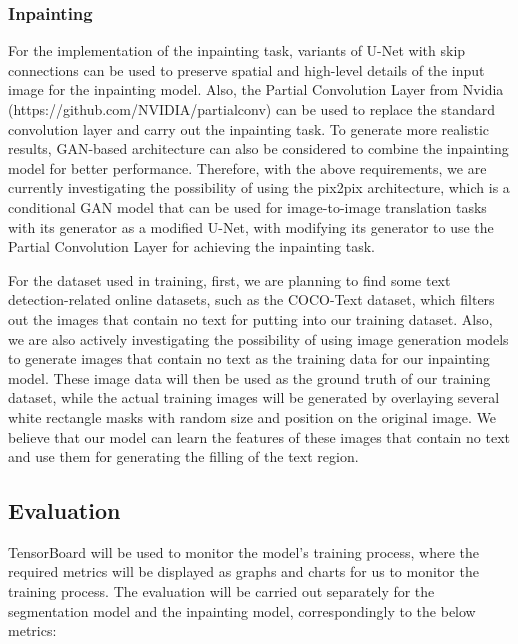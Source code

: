 \documentclass[10pt,twocolumn,letterpaper]{article}
\begin{document}

\subsubsection{Inpainting}


For the implementation of the inpainting task, variants of U-Net with skip connections can be used to preserve spatial and high-level 
details of the input image for the inpainting model. Also, the Partial Convolution Layer from Nvidia 
(https://github.com/NVIDIA/partialconv) can be used to replace the standard convolution layer and carry out the inpainting task. To 
generate more realistic results, GAN-based architecture can also be considered to combine the inpainting model for better performance.
Therefore, with the above requirements, we are currently investigating the possibility of using the pix2pix architecture,
which is a conditional GAN model that can be used for image-to-image translation tasks with its generator as a modified U-Net, 
with modifying its generator to use the Partial Convolution Layer for achieving the inpainting task.

For the dataset used in training, first, we are planning to find some text detection-related online datasets, 
such as the COCO-Text dataset, which filters out the images that contain no text for putting into our training dataset. 
Also, we are also actively investigating the possibility of using image generation models to generate images that contain 
no text as the training data for our inpainting model. These image data will then be used as the ground truth of our training dataset, 
while the actual training images will be generated by overlaying several white rectangle masks with random size and position on the original image. 
We believe that our model can learn the features of these images that contain no text and use them for generating the filling of the text region.

\subsection{Evaluation}

TensorBoard will be used to monitor the model's training process, where the required metrics will be displayed as graphs and charts 
for us to monitor the training process. The evaluation will be carried out separately for the segmentation model and the inpainting 
model, correspondingly to the below metrics:
\end{document}
